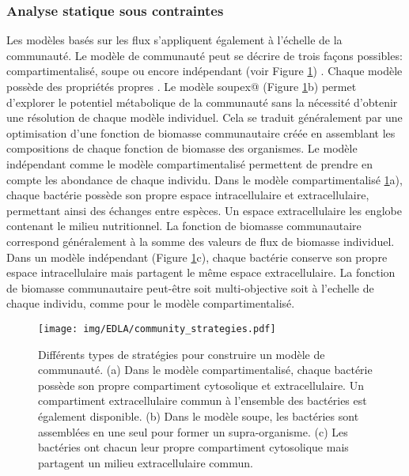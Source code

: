\documentclass[../main.tex]{subfiles}
\begin{document}




\subsubsection{Analyse statique sous contraintes}
Les modèles basés sur les flux s'appliquent également à l'échelle de la communauté. Le modèle de communauté peut se décrire de trois façons possibles: compartimentalisé, soupe ou encore indépendant (voir Figure \ref{fig:community-type}) \citep{Colarusso2021}. Chaque modèle possède des propriétés propres \citep{Succurro2018}. Le modèle soupex@ (Figure \ref{fig:community-type}b) permet d'explorer le potentiel métabolique de la communauté sans la nécessité d'obtenir une résolution de chaque modèle individuel. Cela se traduit généralement par une optimisation d'une fonction de biomasse communautaire créée en assemblant les compositions de chaque fonction de biomasse des organismes. Le modèle indépendant comme le modèle compartimentalisé permettent de prendre en compte les abondance de chaque individu. Dans le modèle compartimentalisé \ref{fig:community-type}a), chaque bactérie possède son propre espace intracellulaire et extracellulaire, permettant ainsi des échanges entre espèces. Un espace extracellulaire les englobe contenant le milieu nutritionnel. La fonction de biomasse communautaire correspond généralement à la somme des valeurs de flux de biomasse individuel. Dans un modèle indépendant (Figure \ref{fig:community-type}c), chaque bactérie conserve son propre espace intracellulaire mais partagent le même espace extracellulaire. La fonction de biomasse communautaire peut-être soit multi-objective soit à l'echelle de chaque individu, comme pour le modèle compartimentalisé. 


\begin{figure} [h!]
    \centering
    \texttt{[image: img/EDLA/community\_strategies.pdf]}
    \caption{Différents types de stratégies pour construire un modèle de communauté. (a) Dans le modèle compartimentalisé, chaque bactérie possède son propre compartiment cytosolique et extracellulaire. Un compartiment extracellulaire commun à l'ensemble des bactéries est également disponible. (b) Dans le modèle soupe, les bactéries sont assemblées en une seul pour former un supra-organisme. (c) Les bactéries ont chacun leur propre compartiment cytosolique mais partagent un milieu extracellulaire commun.}
    \label{fig:community-type}
\end{figure}
\end{document}
